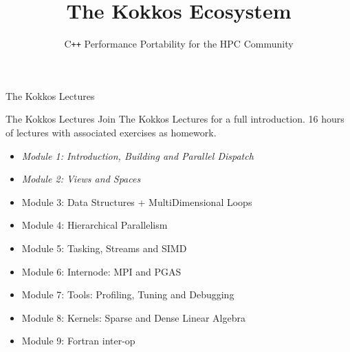 
\usepackage{tikz}


\title{The Kokkos Ecosystem}

\author{C\texttt{++} Performance Portability for the HPC Community}




\shorttrue
\mediumfalse
\fullfalse



% 

\begin{frame}
	\titlepage
\end{frame}



\begin{frame}{The Kokkos Lectures}
        
	\begin{block}{The Kokkos Lectures}
		Join The Kokkos Lectures for a full introduction. 16 hours of lectures with associated exercises as homework.
	\end{block}

\begin{itemize}
	\item \textit{Module 1: Introduction, Building and Parallel Dispatch}
	\item \textit{Module 2: Views and Spaces}
	\item Module 3: Data Structures + MultiDimensional Loops
	\item Module 4: Hierarchical Parallelism
	\item Module 5: Tasking, Streams and SIMD
	\item Module 6: Internode: MPI and PGAS
	\item Module 7: Tools: Profiling, Tuning and Debugging
	\item Module 8: Kernels: Sparse and Dense Linear Algebra
    \item Module 9: Fortran inter-op
\end{itemize}
\end{frame}

